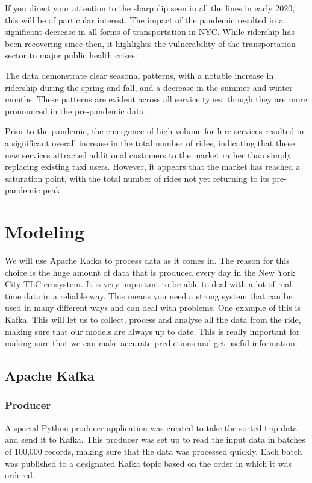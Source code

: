 \documentclass[conference]{IEEEtran}
\begin{document}
If you direct your attention to the sharp dip seen in all the lines in early 2020, this will be of particular interest.
The impact of the pandemic resulted in a significant decrease in all forms of transportation in NYC. While ridership has
been recovering since then, it highlights the vulnerability of the transportation sector to major public health crises.

The data demonstrate clear seasonal patterns, with a notable increase in ridership during the spring and fall, and a
decrease in the summer and winter months. These patterns are evident across all service types, though they are more
pronounced in the pre-pandemic data.

Prior to the pandemic, the emergence of high-volume for-hire services resulted in a significant overall increase in the
total number of rides, indicating that these new services attracted additional customers to the market rather than
simply replacing existing taxi users. However, it appears that the market has reached a saturation point, with the total
number of rides not yet returning to its pre-pandemic peak.


\section{Modeling}

We will use Apache Kafka to process data as it comes in. The reason for this choice is the huge amount of data that is
produced every day in the New York City TLC ecosystem. It is very important to be able to deal with a lot of real-time
data in a reliable way. This means you need a strong system that can be used in many different ways and can deal with
problems. One example of this is Kafka. This will let us to collect, process and analyse all the data from the ride,
making sure that our models are always up to date. This is really important for making sure that we can make accurate
predictions and get useful information.

\subsection{Apache Kafka}

\subsubsection*{Producer} A special Python producer application was created to take the sorted trip data and send it to
Kafka. This producer was set up to read the input data in batches of 100,000 records, making sure that the data was
processed quickly. Each batch was published to a designated Kafka topic based on the order in which it was ordered.
\end{document}
